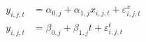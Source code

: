 \begin{align}
  y_{i, j, t} &= \alpha_{0, j} + \alpha_{1, j} x_{i, j, t} + \varepsilon^{x}_{i, j, t} \\
  y_{i, j, t} &= \beta_{0, j} + \beta_{1, j} t + \varepsilon^{t}_{i, j, t}
  \label{eqn:regression-model-observation-level}
\end{align}